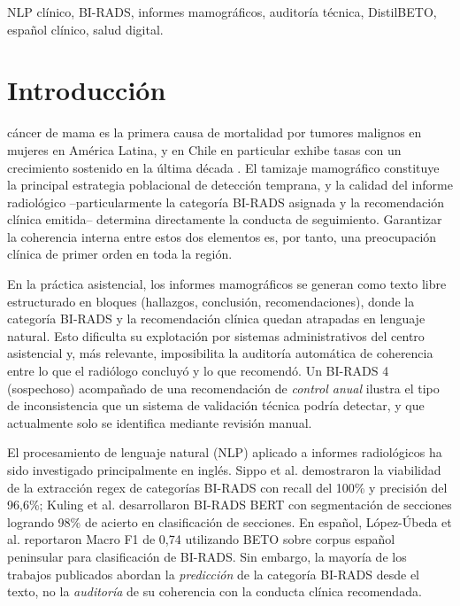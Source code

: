 \documentclass[10pt,journal,a4paper]{IEEEtran}
\begin{document}
\begin{IEEEkeywords}
NLP cl\'inico, BI-RADS, informes mamogr\'aficos, auditor\'ia t\'ecnica, DistilBETO, espa\~nol cl\'inico, salud digital.
\end{IEEEkeywords}

\section{Introducci\'on}\label{sec:intro}
 c\'ancer de mama es la primera causa de mortalidad por tumores malignos en mujeres en Am\'erica Latina, y en Chile en particular exhibe tasas con un crecimiento sostenido en la \'ultima d\'ecada \cite{deis2024}. El tamizaje mamogr\'afico constituye la principal estrategia poblacional de detecci\'on temprana, y la calidad del informe radiol\'ogico --particularmente la categor\'ia BI-RADS asignada y la recomendaci\'on cl\'inica emitida-- determina directamente la conducta de seguimiento. Garantizar la coherencia interna entre estos dos elementos es, por tanto, una preocupaci\'on cl\'inica de primer orden en toda la regi\'on.

En la pr\'actica asistencial, los informes mamogr\'aficos se generan como texto libre estructurado en bloques (hallazgos, conclusi\'on, recomendaciones), donde la categor\'ia BI-RADS y la recomendaci\'on cl\'inica quedan atrapadas en lenguaje natural. Esto dificulta su explotaci\'on por sistemas administrativos del centro asistencial y, m\'as relevante, imposibilita la auditor\'ia autom\'atica de coherencia entre lo que el radi\'ologo concluy\'o y lo que recomend\'o. Un BI-RADS 4 (sospechoso) acompa\~nado de una recomendaci\'on de \emph{control anual} ilustra el tipo de inconsistencia que un sistema de validaci\'on t\'ecnica podr\'ia detectar, y que actualmente solo se identifica mediante revisi\'on manual.

El procesamiento de lenguaje natural (NLP) aplicado a informes radiol\'ogicos ha sido investigado principalmente en ingl\'es. Sippo et al. \cite{sippo2013} demostraron la viabilidad de la extracci\'on regex de categor\'ias BI-RADS con recall del 100\% y precisi\'on del 96,6\%; Kuling et al. \cite{kuling2022} desarrollaron BI-RADS BERT con segmentaci\'on de secciones logrando 98\% de acierto en clasificaci\'on de secciones. En espa\~nol, L\'opez-\'Ubeda et al. \cite{lopez2024} reportaron Macro F1 de 0,74 utilizando BETO sobre corpus espa\~nol peninsular para clasificaci\'on de BI-RADS. Sin embargo, la mayor\'ia de los trabajos publicados abordan la \emph{predicci\'on} de la categor\'ia BI-RADS desde el texto, no la \emph{auditor\'ia} de su coherencia con la conducta cl\'inica recomendada.
\end{document}
